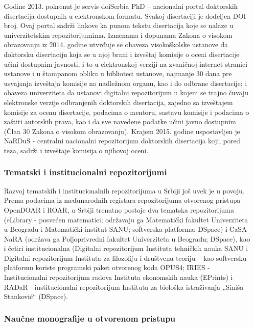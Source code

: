 \documentclass{article}
\begin{document}
Godine 2013. pokrenut je servis doiSerbia PhD – nacionalni portal doktorskih disertacija dostupnih u elektronskom formatu. Svakoj disertaciji je dodeljen DOI broj. Ovaj portal sadrži linkove ka punom tekstu disertacija koje se nalaze u univerzitetskim repozitorijumima. Izmenama i dopunama Zakona o visokom obrazovanju iz 2014. godine utvrđuje se obaveza visokoškolske ustanove da doktorsku disertaciju koja se u njoj brani i izveštaj komisije o oceni disertacije učini dostupnim javnosti, i to u elektronskoj verziji na zvaničnoj internet stranici ustanove i u štampanom obliku u biblioteci ustanove, najmanje 30 dana pre usvajanja izveštaja komisije na nadležnom organu, kao i do odbrane disertacije; i obaveza univerziteta da ustanovi digitalni repozitorijum u kojem se trajno čuvaju elektronske verzije odbranjenih doktorskih disertacija, zajedno sa izveštajem komisije za ocenu disertacije, podacima o mentoru, sastavu komisije i podacima o zaštiti autorskih prava, kao i da sve navedene podatke učini javno dostupnim (Član 30 Zakona o visokom obrazovanju). Krajem 2015. godine uspostavljen je NaRDuS - centralni nacionalni repozitorijum doktorskih disertacija koji, pored teza, sadrži i izveštaje komisija o njihovoj oceni.

\subsubsection{Tematski i institucionalni repozitorijumi}

Razvoj tematskih i institucionalnih repozitorijuma u Srbiji još uvek je u povoju. Prema podacima iz međunarodnih registara repozitorijuma otvorenog pristupa OpenDOAR i ROAR, u Srbiji trenutno postoje dva tematska repozitorijuma (eLibrary - posvećen matematici; održavaju ga Matematički fakultet Univerziteta u Beogradu i Matematički institut SANU; softverska platforma: DSpace) i CaSA NaRA (održava ga Poljoprivredni fakultet Univerziteta u Beogradu; DSpace), kao i četiri institucionalna (Digitalni repozitorijum Instituta tehničkih nauka SANU i Digitalni repozitorijum Instituta za filozofiju i društvenu teoriju – kao softversku platformu koriste programski paket otvorenog koda OPUS4; IRIES - Institucionalni repozitorijum radova Instituta ekonomskih nauka (EPrints) i RADaR - institucionalni repozitorijum Instituta za biološka istraživanja „Siniša Stanković“ (DSpace).

\subsubsection{Naučne monografije u otvorenom pristupu}
\end{document}
